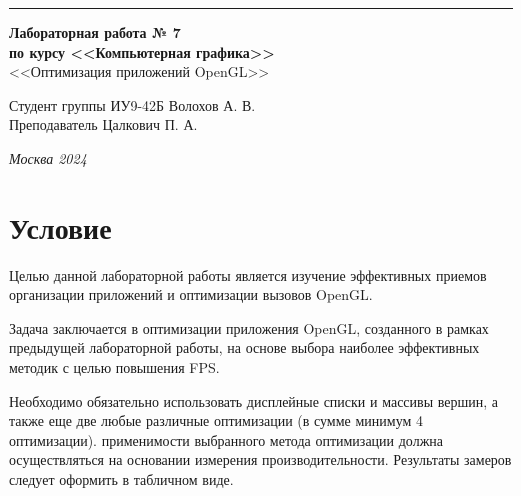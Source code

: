 \documentclass[a4paper, 14pt]{extarticle}
\begin{document}
\begin{titlepage}
\vspace*{-16pt}
\hspace{30pt}\rule{0.866\textwidth}{0.4pt}
  
\vspace{11em}

\begin{center}
\Large {\bf Лабораторная работа № 7} \\
\large {\bf по курсу <<Компьютерная графика>>} \\
\large <<Оптимизация приложений OpenGL>>
\end{center}\normalsize

\vspace{8em}


\begin{flushright}
  {Студент группы ИУ9-42Б Волохов А. В.\hspace*{15pt} \\
  \vspace{2ex}
  Преподаватель Цалкович П. А.\hspace*{15pt}}
\end{flushright}

\bigskip

\vfill


\begin{center}
\textsl{Москва 2024}
\end{center}
\end{titlepage}

\renewcommand{\ttdefault}{pcr}

\setlength{\tabcolsep}{3pt}
\newpage
\setcounter{page}{2}

\section{Условие}\label{Sect::task}
Целью данной лабораторной работы является изучение эффективных приемов организации приложений и оптимизации вызовов OpenGL.
\par
Задача заключается в оптимизации приложения OpenGL, созданного в рамках предыдущей лабораторной работы, на основе выбора наиболее эффективных методик с целью повышения FPS.
\par
Необходимо обязательно использовать дисплейные списки и массивы вершин, а также еще две любые различные оптимизации (в сумме минимум 4 оптимизации).
 применимости выбранного метода оптимизации должна осуществляться на основании измерения производительности. Результаты замеров следует оформить в табличном виде.
\end{document}
